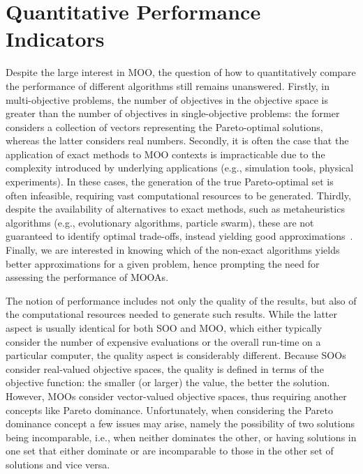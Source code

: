\section{Quantitative Performance Indicators}

Despite the large interest in \ac{MOO}, the question of how to quantitatively compare the performance of different algorithms still remains unanswered. Firstly, in multi-objective problems, the number of objectives in the objective space is greater than the number of objectives in single-objective problems: the former considers a collection of vectors representing the Pareto-optimal solutions, whereas the latter considers real numbers. Secondly, it is often the case that the application of exact methods to \ac{MOO} contexts is impracticable due to the complexity introduced by underlying applications (e.g., simulation tools, physical experiments). In these cases, the generation of the true Pareto-optimal set is often infeasible, requiring vast computational resources to be generated. Thirdly, despite the availability of alternatives to exact methods, such as metaheuristics algorithms (e.g., evolutionary algorithms, particle swarm), these are not guaranteed to identify optimal trade-offs, instead yielding good approximations~\cite{Zitzler2003Metrics}. Finally, we are interested in knowing which of the non-exact algorithms yields better approximations for a given problem, hence prompting the need for assessing the performance of \acp{MOOA}.

The notion of performance includes not only the quality of the results, but also of the computational resources needed to generate such results. While the latter aspect is usually identical for both \ac{SOO} and \ac{MOO}, which either typically consider the number of expensive evaluations or the overall run-time on a particular computer, the quality aspect is considerably different. Because \acp{SOO} consider real-valued objective spaces, the quality is defined in terms of the objective function: the smaller (or larger) the value, the better the solution. However, \acp{MOO} consider vector-valued objective spaces, thus requiring another concepts like Pareto dominance. Unfortunately, when considering the Pareto dominance concept a few issues may arise, namely the possibility of two solutions being incomparable, i.e., when neither dominates the other, or having solutions in one set that either dominate or are incomparable to those in the other set of solutions and vice versa. 

